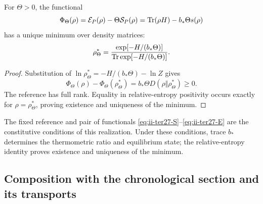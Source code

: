 \begin{corollary}
\label{cor:ii-ter27-variational}
For $\Theta>0$, the functional
\[
 \Phi_\Theta(\rho)=\mathcal E_P(\rho)-\Theta\mathcal S_P(\rho)
 =\operatorname{Tr}(\rho H)-b_*\Theta s(\rho)
\]
has a unique minimum over density matrices:
\begin{equation}
 \rho_\Theta^*=\frac{\exp[-H/(b_*\Theta)]}
                        {\operatorname{Tr}\exp[-H/(b_*\Theta)]}.
 \label{eq:ii-ter27-minimum}
\end{equation}
\end{corollary}
\begin{proof}
Substitution of $\ln\rho_\Theta^*=-H/(b_*\Theta)-\ln Z$ gives
\[
 \Phi_\Theta(\rho)-\Phi_\Theta(\rho_\Theta^*)
 =b_*\Theta D(\rho\Vert\rho_\Theta^*)\ge0.
\]
The reference has full rank. Equality in relative-entropy positivity
occurs exactly for $\rho=\rho_\Theta^*$, proving existence and uniqueness
of the minimum.
\end{proof}

The fixed reference and pair of functionals
\eqref{eq:ii-ter27-S}--\eqref{eq:ii-ter27-E} are the constitutive
conditions of this realization. Under these conditions, trace $b_*$
determines the thermometric ratio and equilibrium state; the relative-entropy
identity proves existence and uniqueness of the minimum.

\subsection{Composition with the chronological section and its transports}
\label{subsec:ii-ter27-map}

